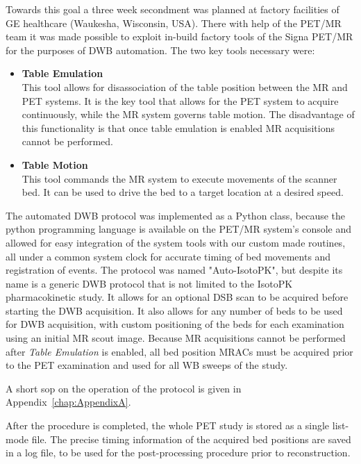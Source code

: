 Towards this goal a three week secondment was planned at factory facilities of GE healthcare (Waukesha, Wisconsin, USA). %
There with help of the PET/MR team it was made possible to exploit in-build factory tools of the Signa PET/MR for the purposes of DWB automation. The two key tools necessary were: 
\begin{itemize}
    \item\textbf{Table Emulation} \\
    This tool allows for disassociation of the table position between the MR and PET systems. It is the key tool that allows for the PET system to acquire continuously, while the MR system governs table motion. The disadvantage of this functionality is that once table emulation is enabled MR acquisitions cannot be performed.%
    \item\textbf{Table Motion} \\
    This tool commands the MR system to execute movements of the scanner bed. It can be used to drive the bed to a target location at a desired speed. 
\end{itemize}

The automated DWB protocol was implemented as a Python class, because the python programming language is available on the PET/MR system's console and allowed for easy integration of the system tools with our custom made routines, all under a common system clock for accurate timing of bed movements and registration of events.
The protocol was named "Auto-IsotoPK", but despite its name is a generic DWB protocol that is not limited to the IsotoPK pharmacokinetic study. It allows for an optional DSB scan to be acquired before starting the DWB acquisition. It also allows for any number of beds to be used for DWB acquisition, with custom positioning of the beds for each examination using an initial MR scout image. 
Because MR acquisitions cannot be performed after \textit{Table Emulation} is enabled, all bed position MRACs must be acquired prior to the PET examination and used for all WB sweeps of the study.

A short \gls{sop} on the operation of the protocol is given in Appendix~\ref{chap:AppendixA}.

After the procedure is completed, the whole PET study is stored as a single list-mode file. The precise timing information of the acquired bed positions are saved in a log file, to be used for the post-processing procedure prior to reconstruction.  

